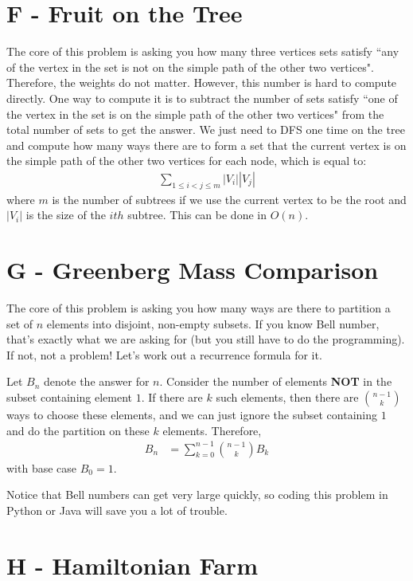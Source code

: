 \documentclass{article}
\begin{document}
\section*{F - Fruit on the Tree}

The core of this problem is asking you how many three vertices sets satisfy ``any of the vertex in the set is not on the simple path of the other two vertices". Therefore, the weights do not matter. However, this number is hard to compute directly. One way to compute it is to subtract the number of sets satisfy ``one of the vertex in the set is on the simple path of the other two vertices" from the total number of sets to get the answer. We just need to DFS one time on the tree and compute how many ways there are to form a set that the current vertex is on the simple path of the other two vertices for each node, which is equal to:
\begin{align*}
	\sum_{1\leq i<j\leq m}^{}{|V_i||V_j|}
\end{align*}
where $m$ is the number of subtrees if we use the current vertex to be the root and $|V_i|$ is the size of the $ith$ subtree. This can be done in $O(n)$.

\section*{G - Greenberg Mass Comparison}

The core of this problem is asking you how many ways are there to partition a set of $n$ elements into disjoint, non-empty subsets. If you know Bell number, that's exactly what we are asking for (but you still have to do the programming). If not, not a problem! Let's work out a recurrence formula for it.

Let $B_n$ denote the answer for $n$. Consider the number of elements \textbf{NOT} in the subset containing element $1$. If there are $k$ such elements, then there are $\binom{n-1}{k}$ ways to choose these elements, and we can just ignore the subset containing $1$ and do the partition on these $k$ elements. Therefore,
\begin{align*}
	B_n &= \sum_{k=0}^{n-1}{\binom{n-1}{k} B_k}
\end{align*}
with base case $B_0 = 1$.

Notice that Bell numbers can get very large quickly, so coding this problem in Python or Java will save you a lot of trouble.

\section*{H - Hamiltonian Farm}
\end{document}
